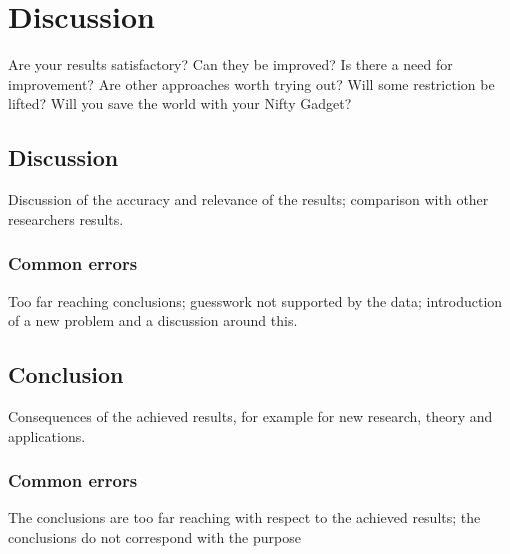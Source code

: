 \chapter{Discussion}
Are your results satisfactory? 
Can they be improved? 
Is there a need for improvement? 
Are other approaches worth trying out? 
Will some restriction be lifted? 
Will you save the world with your Nifty Gadget? 

\section{Discussion} 
Discussion of the accuracy and relevance of the results; comparison with other researchers results. 
\subsection{Common errors}
Too far reaching conclusions; guesswork not supported by the data; introduction of a new problem and a discussion around this.  

\section{Conclusion} 
Consequences of the achieved results, for example for new research, theory and applications. 

\subsection{Common errors}
The conclusions are too far reaching with respect to the achieved results; the conclusions do not correspond with the purpose